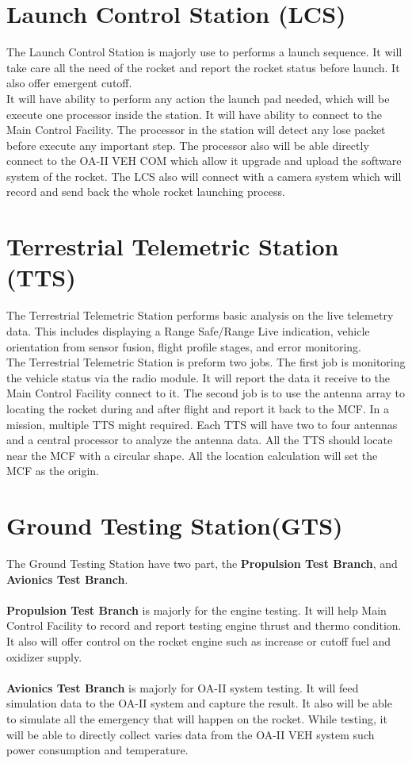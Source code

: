 \documentclass[12pt,article]{memoir}
\begin{document}
\section{Launch Control Station (LCS)}
The Launch Control Station is majorly use to performs a launch sequence. It will take care all the need of the rocket and report the rocket status before launch. It also offer emergent cutoff. \\
It will have ability to perform any action the launch pad needed, which will be execute one processor inside the station. It will have ability to connect to the Main Control Facility. The processor in the station will detect any lose packet before execute any important step. The processor also will be able directly connect to the OA-II VEH COM which allow it upgrade and upload the software system of the rocket. The LCS also will connect with a camera system which will record and send back the whole rocket launching process. 
\section{Terrestrial Telemetric Station (TTS)}
The Terrestrial Telemetric Station performs basic analysis on the live telemetry data. This includes displaying a Range Safe/Range Live indication, vehicle orientation from sensor fusion, flight profile stages, and error monitoring.\\
The Terrestrial Telemetric Station is preform two jobs. The first job is monitoring the vehicle status via the radio module. It will report the data it receive to the Main Control Facility connect to it. The second job is to use the antenna array to locating the rocket during and after flight and report it back to the MCF. In a mission, multiple TTS might required. Each TTS will have two to four antennas and a central processor to analyze the antenna data. All the TTS should locate near the MCF with a circular shape. All the location calculation will set the MCF as the origin.
\section{Ground Testing Station(GTS)}
The Ground Testing Station have two part, the \textbf{Propulsion Test Branch}, and \textbf{Avionics Test Branch}.\\\\
\textbf{Propulsion Test Branch} is majorly for the engine testing. It will help Main Control Facility to record and report testing engine thrust and thermo condition. It also will offer control on the rocket engine such as increase or cutoff fuel and oxidizer supply.\\\\
\textbf{Avionics Test Branch} is majorly for OA-II system testing. It will feed simulation data to the OA-II system and capture the result. It also will be able to simulate all the emergency that will happen on the rocket. While testing, it will be able to directly collect varies data from the OA-II VEH system such power consumption and temperature.
\end{document}
